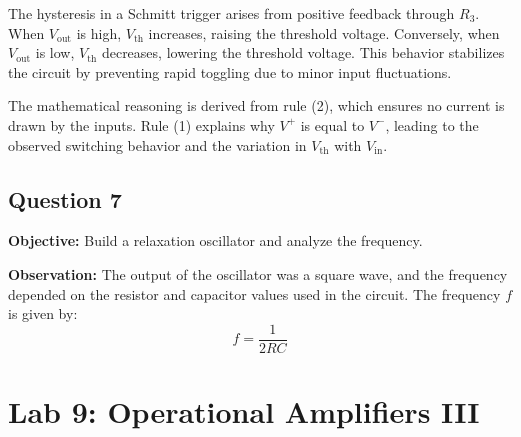 \documentclass{article}
\begin{document}
The hysteresis in a Schmitt trigger arises from positive feedback through \( R_3 \). When \( V_{\text{out}} \) is high, \( V_{\text{th}} \) increases, raising the threshold voltage. Conversely, when \( V_{\text{out}} \) is low, \( V_{\text{th}} \) decreases, lowering the threshold voltage. This behavior stabilizes the circuit by preventing rapid toggling due to minor input fluctuations.

The mathematical reasoning is derived from rule (2), which ensures no current is drawn by the inputs. Rule (1) explains why \( V^+ \) is equal to \( V^- \), leading to the observed switching behavior and the variation in \( V_{\text{th}} \) with \( V_{\text{in}} \).


\subsection*{Question 7}
\textbf{Objective:} Build a relaxation oscillator and analyze the frequency.

\textbf{Observation:}
The output of the oscillator was a square wave, and the frequency depended on the resistor and capacitor values used in the circuit. The frequency \( f \) is given by:
\[
f = \frac{1}{2RC}
\]

\section*{Lab 9: Operational Amplifiers III}
\end{document}

